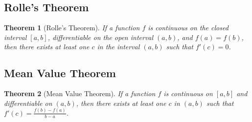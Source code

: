 \documentclass[a4paper,12pt]{book}
\newcounter{example}
\newtheorem{theorem}{Theorem}
\begin{document}
\subsection{Rolle's Theorem}
\begin{theorem}[Rolle's Theorem]
If a function \( f \) is continuous on the closed interval \([a, b]\), differentiable on the open interval \((a, b)\), and \(f(a) = f(b)\), then there exists at least one \(c\) in the interval \((a, b)\) such that \(f'(c) = 0\).
\end{theorem}

\begin{center}
\end{center}

\subsection{Mean Value Theorem}
\begin{theorem}[Mean Value Theorem]
If a function \( f \) is continuous on \([a, b]\) and differentiable on \((a, b)\), then there exists at least one \(c\) in \((a, b)\) such that \(f'(c) = \frac{f(b) - f(a)}{b - a}\).
\end{theorem}
\end{document}
